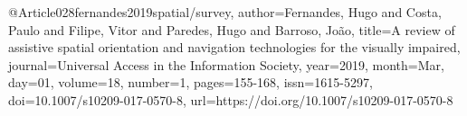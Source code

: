 @Article{028fernandes2019spatial/survey,
author={Fernandes, Hugo
and Costa, Paulo
and Filipe, Vitor
and Paredes, Hugo
and Barroso, Jo{\~a}o},
title={A review of assistive spatial orientation and navigation technologies for the visually impaired},
journal={Universal Access in the Information Society},
year={2019},
month={Mar},
day={01},
volume={18},
number={1},
pages={155-168},
issn={1615-5297},
doi={10.1007/s10209-017-0570-8},
url={https://doi.org/10.1007/s10209-017-0570-8}
}